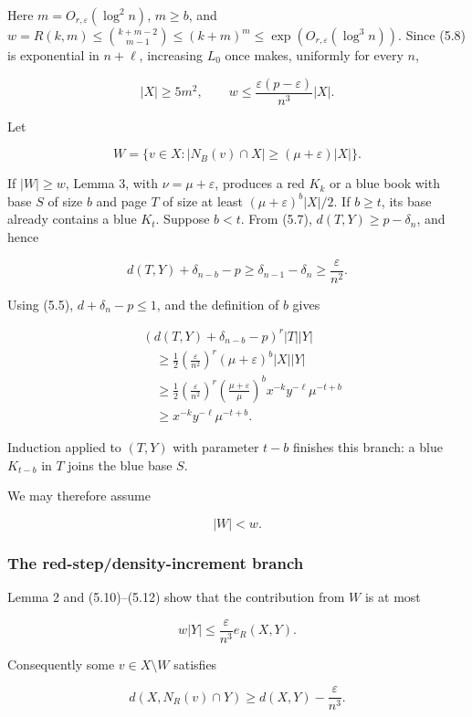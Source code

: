 Here \(m=O_{r,\varepsilon}(\log^2n)\), \(m\ge b\), and
\(w=R(k,m)\le\binom{k+m-2}{m-1}\le(k+m)^m \le\exp(O_{r,\varepsilon}(\log^3n))\).
Since (5.8) is exponential in \(n+\ell\), increasing \(L_0\) once makes,
uniformly for every \(n\),

\[
|X|\ge5m^2,\qquad
w\le\frac{\varepsilon(p-\varepsilon)}{n^3}|X|.
\tag{5.10}
\]

Let

\[
W=\{v\in X:|N_B(v)\cap X|\ge(\mu+\varepsilon)|X|\}.
\]

If \(|W|\ge w\), Lemma 3, with \(\nu=\mu+\varepsilon\), produces a red
\(K_k\) or a blue book with base \(S\) of size \(b\) and page \(T\) of
size at least \((\mu+\varepsilon)^b|X|/2\). If \(b\ge t\), its base
already contains a blue \(K_t\). Suppose \(b<t\). From (5.7),
\(d(T,Y)\ge p-\delta_n\), and hence

\[
d(T,Y)+\delta_{n-b}-p
\ge\delta_{n-1}-\delta_n\ge\frac\varepsilon{n^2}.
\]

Using (5.5), \(d+\delta_n-p\le1\), and the definition of \(b\) gives

\[
\begin{aligned}
&(d(T,Y)+\delta_{n-b}-p)^r|T||Y|\\
&\quad\ge
\frac12\left(\frac\varepsilon{n^2}\right)^r
(\mu+\varepsilon)^b|X||Y|\\
&\quad\ge
\frac12\left(\frac\varepsilon{n^2}\right)^r
\left(\frac{\mu+\varepsilon}{\mu}\right)^b
x^{-k}y^{-\ell}\mu^{-t+b}\\
&\quad\ge x^{-k}y^{-\ell}\mu^{-t+b}.
\end{aligned}
\tag{5.11}
\]

Induction applied to \((T,Y)\) with parameter \(t-b\) finishes this
branch: a blue \(K_{t-b}\) in \(T\) joins the blue base \(S\).

We may therefore assume

\[
|W|<w.
\tag{5.12}
\]

\subsubsection{The red-step/density-increment branch}

Lemma 2 and (5.10)--(5.12) show that the contribution from \(W\) is at
most

\[
w|Y|\le\frac\varepsilon{n^3}e_R(X,Y).
\]

Consequently some \(v\in X\setminus W\) satisfies

\[
d(X,N_R(v)\cap Y)
\ge d(X,Y)-\frac\varepsilon{n^3}.
\tag{5.13}
\]

